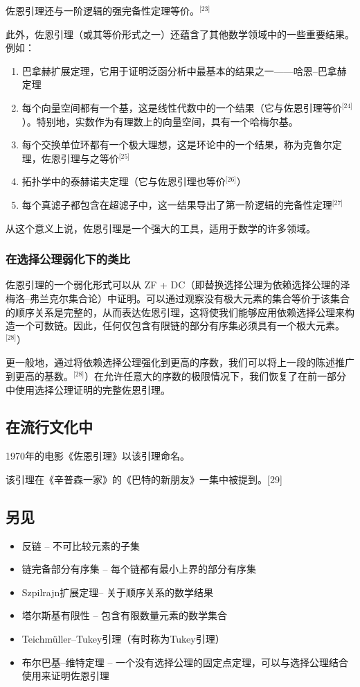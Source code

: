 佐恩引理还与一阶逻辑的强完备性定理等价。\(^\text{[23]}\)

此外，佐恩引理（或其等价形式之一）还蕴含了其他数学领域中的一些重要结果。例如：
\begin{enumerate}
\item 巴拿赫扩展定理，它用于证明泛函分析中最基本的结果之一——哈恩–巴拿赫定理
\item 每个向量空间都有一个基，这是线性代数中的一个结果（它与佐恩引理等价\(^\text{[24]}\)）。特别地，实数作为有理数上的向量空间，具有一个哈梅尔基。
\item 每个交换单位环都有一个极大理想，这是环论中的一个结果，称为克鲁尔定理，佐恩引理与之等价\(^\text{[25]}\)
\item 拓扑学中的泰赫诺夫定理（它与佐恩引理也等价\(^\text{[26]}\)）
\item 每个真滤子都包含在超滤子中，这一结果导出了第一阶逻辑的完备性定理\(^\text{[27]}\)
\end{enumerate}
从这个意义上说，佐恩引理是一个强大的工具，适用于数学的许多领域。
\subsubsection{在选择公理弱化下的类比}  
佐恩引理的一个弱化形式可以从 ZF + DC（即替换选择公理为依赖选择公理的泽梅洛–弗兰克尔集合论）中证明。可以通过观察没有极大元素的集合等价于该集合的顺序关系是完整的，从而表达佐恩引理，这将使我们能够应用依赖选择公理来构造一个可数链。因此，任何仅包含有限链的部分有序集必须具有一个极大元素。\(^\text{[28]}\)）

更一般地，通过将依赖选择公理强化到更高的序数，我们可以将上一段的陈述推广到更高的基数。\(^\text{[28]}\)）在允许任意大的序数的极限情况下，我们恢复了在前一部分中使用选择公理证明的完整佐恩引理。
\subsection{在流行文化中}  
1970年的电影《佐恩引理》以该引理命名。

该引理在《辛普森一家》的《巴特的新朋友》一集中被提到。[29]
\subsection{另见}  
\begin{itemize}
\item 反链 – 不可比较元素的子集  
\item 链完备部分有序集 – 每个链都有最小上界的部分有序集  
\item Szpilrajn扩展定理– 关于顺序关系的数学结果  
\item 塔尔斯基有限性 – 包含有限数量元素的数学集合  
\item Teichmüller–Tukey引理（有时称为Tukey引理）  
\item 布尔巴基–维特定理 – 一个没有选择公理的固定点定理，可以与选择公理结合使用来证明佐恩引理
\end{itemize}

